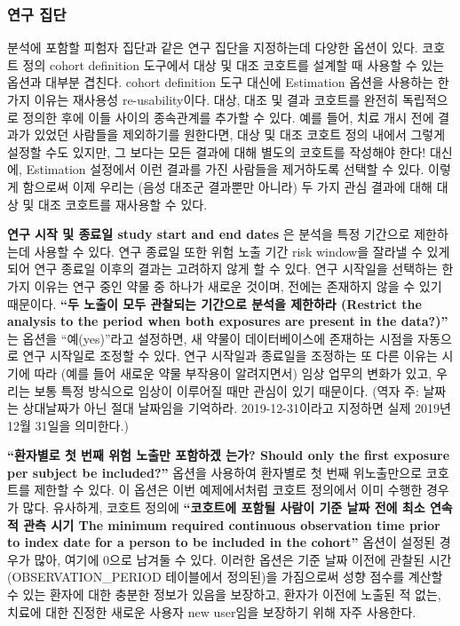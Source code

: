 \documentclass[11pt]{book}
\theoremstyle{definition}
\theoremstyle{definition}
\theoremstyle{definition}
\theoremstyle{remark}
\begin{document}
\subsubsection*{연구 집단}\label{-}

분석에 포함할 피험자 집단과 같은 연구 집단을 지정하는데 다양한 옵션이
있다. 코호트 정의 cohort definition 도구에서 대상 및 대조 코호트를
설계할 때 사용할 수 있는 옵션과 대부분 겹친다. cohort definition 도구
대신에 Estimation 옵션을 사용하는 한 가지 이유는 재사용성
re-usability이다. 대상, 대조 및 결과 코호트를 완전히 독립적으로 정의한
후에 이들 사이의 종속관계를 추가할 수 있다. 예를 들어, 치료 개시 전에
결과가 있었던 사람들을 제외하기를 원한다면, 대상 및 대조 코호트 정의
내에서 그렇게 설정할 수도 있지만, 그 보다는 모든 결과에 대해 별도의
코호트를 작성해야 한다! 대신에, Estimation 설정에서 이런 결과를 가진
사람들을 제거하도록 선택할 수 있다. 이렇게 함으로써 이제 우리는 (음성
대조군 결과뿐만 아니라) 두 가지 관심 결과에 대해 대상 및 대조 코호트를
재사용할 수 있다.

\textbf{연구 시작 및 종료일 study start and end dates} 은 분석을 특정
기간으로 제한하는데 사용할 수 있다. 연구 종료일 또한 위험 노출 기간 risk
window을 잘라낼 수 있게되어 연구 종료일 이후의 결과는 고려하지 않게 할
수 있다. 연구 시작일을 선택하는 한 가지 이유는 연구 중인 약물 중 하나가
새로운 것이며, 전에는 존재하지 않을 수 있기 때문이다. \textbf{``두
노출이 모두 관찰되는 기간으로 분석을 제한하라 (Restrict the analysis to
the period when both exposures are present in the data?)''} 는 옵션을
``예(yes)''라고 설정하면, 새 약물이 데이터베이스에 존재하는 시점을
자동으로 연구 시작일로 조정할 수 있다. 연구 시작일과 종료일을 조정하는
또 다른 이유는 시기에 따라 (예를 들어 새로운 약물 부작용이 알려지면서)
임상 업무의 변화가 있고, 우리는 보통 특정 방식으로 임상이 이루어질 때만
관심이 있기 때문이다. (역자 주: 날짜는 상대날짜가 아닌 절대 날짜임을
기억하라. 2019-12-31이라고 지정하면 실제 2019년 12월 31일을 의미한다.)

\textbf{``환자별로 첫 번째 위험 노출만 포함하겠 는가? Should only the
first exposure per subject be included?''} 옵션을 사용하여 환자별로 첫
번째 위노출만으로 코호트를 제한할 수 있다. 이 옵션은 이번 예제에서처럼
코호트 정의에서 이미 수행한 경우가 많다. 유사하게, 코호트 정의에
\textbf{``코호트에 포함될 사람이 기준 날짜 전에 최소 연속적 관측 시기
The minimum required continuous observation time prior to index date for
a person to be included in the cohort''} 옵션이 설정된 경우가 많아,
여기에 0으로 남겨둘 수 있다. 이러한 옵션은 기준 날짜 이전에 관찰된 시간
(OBSERVATION\_PERIOD 테이블에서 정의된)을 가짐으로써 성향 점수를 계산할
수 있는 환자에 대한 충분한 정보가 있음을 보장하고, 환자가 이전에 노출된
적 없는, 치료에 대한 진정한 새로운 사용자 new user임을 보장하기 위해
자주 사용한다.
\end{document}
